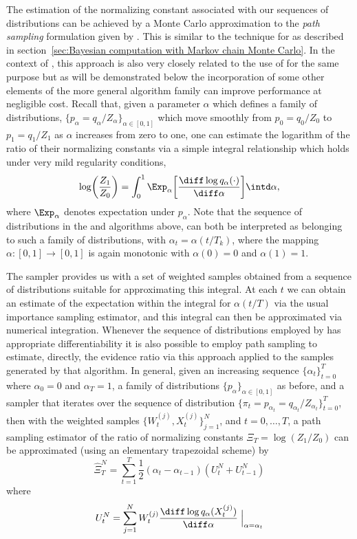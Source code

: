 The estimation of the normalizing constant associated with our sequences of
distributions can be achieved by a Monte Carlo approximation to the \emph{path
  sampling} formulation given by \cite{Gelman:1998ei}. This is similar to the
technique for \pmcmc as described in section~\ref{sec:Bayesian computation
  with Markov chain Monte Carlo}. In the context of \smc, this approach is
also very closely related to the use of \ais for the same purpose
\cite{Neal:2001we} but as will be demonstrated below the incorporation of some
other elements of the more general \smc algorithm family can improve
performance at negligible cost. Recall that, given a parameter $\alpha$ which
defines a family of distributions, $\{p_{\alpha} = q_{\alpha} /
Z_\alpha\}_{\alpha \in [0,1]}$ which move smoothly from $p_0 = q_0 / Z_0$ to
$p_1 = q_1 / Z_1$ as $\alpha$ increases from zero to one, one can estimate the
logarithm of the ratio of their normalizing constants via a simple integral
relationship which holds under very mild regularity conditions,
\begin{equation}
  \log\biggl( \frac{Z_1}{Z_0} \biggr) =
  \int_{0}^{1} \Exp_\alpha \biggl[
  \frac{\diff\log q_{\alpha}(\cdot)}{\diff\alpha}
  \biggr] \intd\alpha, \label{eq:path_identity}
\end{equation}
where $\Exp_\alpha$ denotes expectation under $p_\alpha$. Note that the
sequence of distributions in the \smc[2] and \smc[3] algorithms above, can both be
interpreted as belonging to such a family of distributions, with $\alpha_t =
\alpha(t/T_k)$, where the mapping $\alpha:[0,1]\to[0,1]$ is again monotonic
with $\alpha(0) = 0$ and $\alpha(1) = 1$.

The \smc sampler provides us with a set of weighted samples obtained from a
sequence of distributions suitable for approximating this integral. At each
$t$ we can obtain an estimate of the expectation within the integral for
$\alpha(t/T)$ via the usual importance sampling estimator, and this integral
can then be approximated via numerical integration. Whenever the sequence
of distributions employed by \smc[3] has appropriate differentiability it is
also possible to employ path sampling to estimate, directly, the evidence
ratio via this approach applied to the samples generated by that algorithm. In
general, given an increasing sequence $\{\alpha_t\}_{t=0}^T$ where $\alpha_0 =
0$ and $\alpha_T = 1$, a family of distributions
$\{p_{\alpha}\}_{\alpha\in[0,1]}$ as before, and a \smc sampler that iterates
over the sequence of distribution $\{\pi_t = p_{\alpha_t} =
q_{\alpha_t}/Z_{\alpha_t}\}_{t=0}^T$, then with the weighted samples
$\{W_t^{(j)},X_t^{(j)}\}_{j=1}^N$, and $t = 0,\dots,T$, a path sampling
estimator of the ratio of normalizing constants $\Xi_T = \log(Z_1/Z_0)$
can be approximated (using an elementary trapezoidal scheme) by
\begin{equation}
  \hat\Xi_{T}^{N} = \sum_{t=1}^T
  \frac{1}{2}(\alpha_t - \alpha_{t - 1})(U_t^N + U_{t-1}^N)
  \label{eq:path_est}
\end{equation}
where
\begin{equation}
  U_t^N = \sum_{j=1}^N
  W_t^{(j)} \frac{\diff\log q_{\alpha}(X_t^{(j)})}{\diff\alpha}
  \Bigm|_{\alpha = \alpha_t}
\end{equation}

